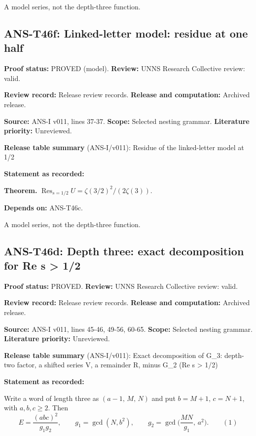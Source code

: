 \documentclass[
  11pt,
]{article}
\begin{document}
A model series, not the depth-three function.

\hypertarget{ans-t46f-linked-letter-model-residue-at-one-half}{%
\subsection{ANS-T46f: Linked-letter model: residue at one
half}\label{ans-t46f-linked-letter-model-residue-at-one-half}}

\textbf{Proof status:} PROVED (model). \textbf{Review:} UNNS Research
Collective review: valid.

\textbf{Review record:} Release review records. \textbf{Release and
computation:} Archived release.

\textbf{Source:} ANS-I v011, lines 37-37. \textbf{Scope:} Selected
nesting grammar. \textbf{Literature priority:} Unreviewed.

\textbf{Release table summary} (ANS-I/v011): Residue of the
linked-letter model at 1/2

\textbf{Statement as recorded:}

\textbf{Theorem.}
\(\operatorname{Res}_{s=1/2}U=\zeta(3/2)^2/(2\zeta(3))\).

\textbf{Depends on:} ANS-T46c.

A model series, not the depth-three function.

\hypertarget{ans-t46d-depth-three-exact-decomposition-for-re-s-12}{%
\subsection{ANS-T46d: Depth three: exact decomposition for Re s
\textgreater{}
1/2}\label{ans-t46d-depth-three-exact-decomposition-for-re-s-12}}

\textbf{Proof status:} PROVED. \textbf{Review:} UNNS Research Collective
review: valid.

\textbf{Review record:} Release review records. \textbf{Release and
computation:} Archived release.

\textbf{Source:} ANS-I v011, lines 45-46, 49-56, 60-65. \textbf{Scope:}
Selected nesting grammar. \textbf{Literature priority:} Unreviewed.

\textbf{Release table summary} (ANS-I/v011): Exact decomposition of
G\_3: depth-two factor, a shifted series V, a remainder R, minus G\_2
(Re s \textgreater{} 1/2)

\textbf{Statement as recorded:}

Write a word of length three as \((a-1,\,M,\,N)\) and put \(b=M+1\),
\(c=N+1\), with \(a,b,c\ge2\). Then
\[E=\frac{(abc)^2}{g_1g_2},\qquad g_1=\gcd(N,b^2),\qquad g_2=\gcd\Big(\frac{MN}{g_1},\,a^2\Big).\qquad(1)\]
\end{document}
